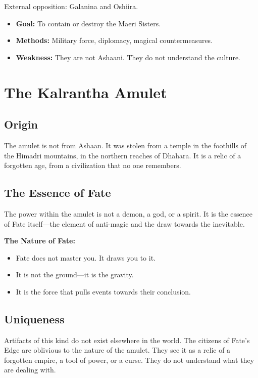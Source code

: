 \documentclass[11pt,twoside]{book}
\newenvironment{mechanicbox}{\begin{mdframed}[style=mechanicbox]}{\end{mdframed}}
\begin{document}
External opposition: Galanina and Oshiira.

\begin{itemize}
    \item \textbf{Goal:} To contain or destroy the Maeri Sisters.
    \item \textbf{Methods:} Military force, diplomacy, magical countermeasures.
    \item \textbf{Weakness:} They are not Ashaani. They do not understand the culture.
\end{itemize}

\chapter{The Kalrantha Amulet}

\section{Origin}

The amulet is not from Ashaan. It was stolen from a temple in the foothills of the Himadri mountains, in the northern reaches of Dhahara. It is a relic of a forgotten age, from a civilization that no one remembers.

\section{The Essence of Fate}

The power within the amulet is not a demon, a god, or a spirit. It is the essence of Fate itself---the element of anti-magic and the draw towards the inevitable.

\begin{mechanicbox}
\textbf{The Nature of Fate:}
\begin{itemize}
    \item Fate does not master you. It draws you to it.
    \item It is not the ground---it is the gravity.
    \item It is the force that pulls events towards their conclusion.
\end{itemize}
\end{mechanicbox}

\section{Uniqueness}

Artifacts of this kind do not exist elsewhere in the world. The citizens of Fate's Edge are oblivious to the nature of the amulet. They see it as a relic of a forgotten empire, a tool of power, or a curse. They do not understand what they are dealing with.
\end{document}

